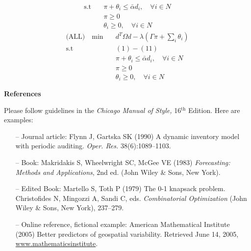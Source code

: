 \documentclass[11pt]{article}
\begin{document}
\begin{itemize}
\begin{align*}
\text{s.t} \quad & \pi + \theta_i \leq   \bar{\alpha} d_i, \quad \forall i \in N \\
& \pi \geq 0 \quad \\
&  \theta_i \geq 0, \quad \forall i \in N 
\end{align*}
\begin{align*}
\text{(ALL)} \quad \min \quad & d^T\Omega d  -  \lambda (\Gamma \pi + \sum_{i} \theta_i  ) \\
\text{s.t } \quad & (1) - (11)\\
&\pi + \theta_i \leq   \bar{\alpha} d_i, \quad \forall i \in N \\
&\pi \geq 0 \\
& \theta_i \geq 0, \quad \forall i \in N 
\end{align*}
\end{itemize}

\textbf{References}

\bgroup
\parskip0pt

Please follow guidelines in the \textit{Chicago Manual of Style,} 16$^{\text{th}}$ Edition. Here are examples: 

\begin{itemize}
\item[--] Journal article: Flynn J, Gartska SK (1990) A dynamic inventory model with periodic auditing. \textit{Oper. Res.} 38(6):1089--1103. 
\item[--] Book: Makridakis S, Wheelwright SC, McGee VE (1983) \textit{Forecasting: Methods and Applications}, 2nd ed. (John Wiley {\&} Sons, New York). 
\item[--] Edited Book: Martello S, Toth P (1979) The 0-1 knapsack problem. Christofides N, Mingozzi A, Sandi C, eds. \textit{Combinatorial Optimization} (John Wiley {\&} Sons, New York), 237--279.
\item[--] Online reference, fictional example: American Mathematical Institute (2005) Better predictors of geospatial variability. Retrieved June 14, 2005, \underline {www.mathematicsinstitute}.


\end{itemize}
\egroup
\end{document}
